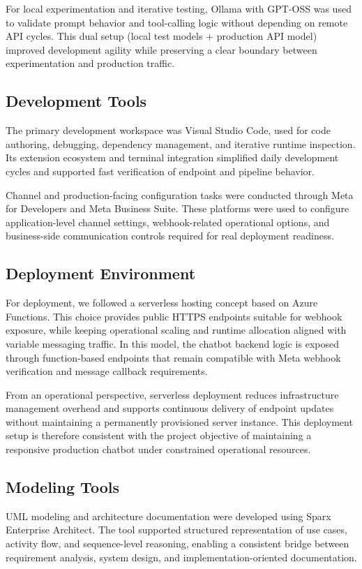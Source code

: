 For local experimentation and iterative testing, Ollama\cite{ollama_docs} with GPT-OSS\cite{gpt_oss_ollama_page} was used to validate prompt behavior and tool-calling logic without depending on remote API cycles. This dual setup (local test models + production API model) improved development agility while preserving a clear boundary between experimentation and production traffic.

\subsection{Development Tools}
The primary development workspace was Visual Studio Code\cite{vscode_docs}, used for code authoring, debugging, dependency management, and iterative runtime inspection. Its extension ecosystem and terminal integration simplified daily development cycles and supported fast verification of endpoint and pipeline behavior.

Channel and production-facing configuration tasks were conducted through Meta for Developers\cite{meta_developer_platform_docs} and Meta Business Suite\cite{meta_business_suite_docs}. These platforms were used to configure application-level channel settings, webhook-related operational options, and business-side communication controls required for real deployment readiness.

\subsection{Deployment Environment}
For deployment, we followed a serverless hosting concept based on Azure Functions\cite{azure_functions_docs}. This choice provides public HTTPS endpoints suitable for webhook exposure, while keeping operational scaling and runtime allocation aligned with variable messaging traffic. In this model, the chatbot backend logic is exposed through function-based endpoints that remain compatible with Meta webhook verification and message callback requirements.

From an operational perspective, serverless deployment reduces infrastructure management overhead and supports continuous delivery of endpoint updates without maintaining a permanently provisioned server instance. This deployment setup is therefore consistent with the project objective of maintaining a responsive production chatbot under constrained operational resources.

\subsection{Modeling Tools}
UML modeling and architecture documentation were developed using Sparx Enterprise Architect\cite{sparx_ea_docs}. The tool supported structured representation of use cases, activity flow, and sequence-level reasoning, enabling a consistent bridge between requirement analysis, system design, and implementation-oriented documentation.

